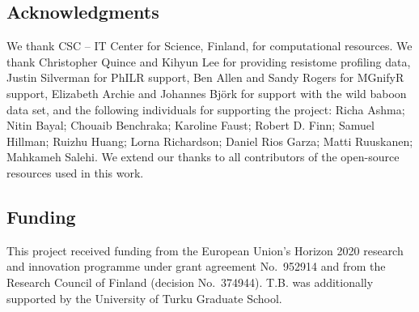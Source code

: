\documentclass[
  sn-nature,
]{sn-jnl}
\begin{document}
\subsection{Acknowledgments}\label{sec-acknowledgments}

We thank CSC -- IT Center for Science, Finland, for computational
resources. We thank Christopher Quince and Kihyun Lee for providing
resistome profiling data, Justin Silverman for PhILR support, Ben Allen
and Sandy Rogers for MGnifyR support, Elizabeth Archie and Johannes
Björk for support with the wild baboon data set, and the following
individuals for supporting the project: Richa Ashma; Nitin Bayal;
Chouaib Benchraka; Karoline Faust; Robert D. Finn; Samuel Hillman;
Ruizhu Huang; Lorna Richardson; Daniel Rios Garza; Matti Ruuskanen;
Mahkameh Salehi. We extend our thanks to all contributors of the
open-source resources used in this work.

\subsection{Funding}\label{sec-funding}

This project received funding from the European Union's Horizon 2020
research and innovation programme under grant agreement No.~952914 and
from the Research Council of Finland (decision No.~374944). T.B. was
additionally supported by the University of Turku Graduate School.
\end{document}
